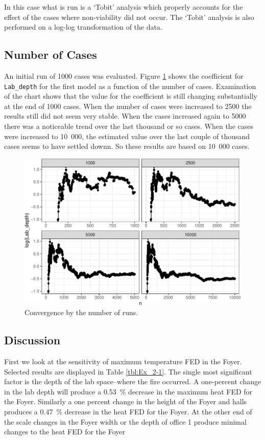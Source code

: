 \documentclass[12pt,twoside]{book}
\begin{document}
In this case what is run is a `Tobit' analysis\cite{Tobin:1958} which properly accounts for the effect of the cases where non-viability did not occur. The `Tobit' analysis is also performed on a log-log transformation of the data.

\hypertarget{number-of-cases}{%
\subsection{Number of Cases}\label{number-of-cases}}

An initial run of 1000 cases was evaluated. Figure \ref{Ex_2-convergence_of_mean} shows the coefficient for \texttt{Lab\_depth} for the first model as a function of the number of cases. Examination of the chart shows that the value for the coefficient is still changing substantially at the end of 1000 cases. When the number of cases were increased to 2500 the results still did not seem very stable. When the cases increased again to 5000 there was a noticeable trend over the last thousand or so cases. When the cases were increased to 10~000, the estimated value over the last couple of thousand cases seems to have settled downn. So these results are based on 10~000 cases.

\begin{figure}[h!]
\centering
\includegraphics[width=4.5in]{FIGURES/ex2_cvg_plot-1.pdf}
\caption{Convergence by the number of runs.}
\label{Ex_2-convergence_of_mean}
\end{figure}

\hypertarget{discussion}{%
\subsection{Discussion}\label{discussion}}

First we look at the sensitivity of maximum temperature FED in the Foyer. Selected results are displayed in Table  \ref{tbl:Ex_2-1}. The single most significant factor is the depth of the lab space--where the fire occurred. A one-percent change in the lab depth will produce a 0.53~\% decrease in the maximum heat FED for the Foyer. Similarly a one percent change in the height of the Foyer and halls produces a 0.47~\% decrease in the heat FED for the Foyer. At the other end of the scale changes in the Foyer width or the depth of office 1 produce minimal changes to the heat FED for the Foyer
\end{document}
